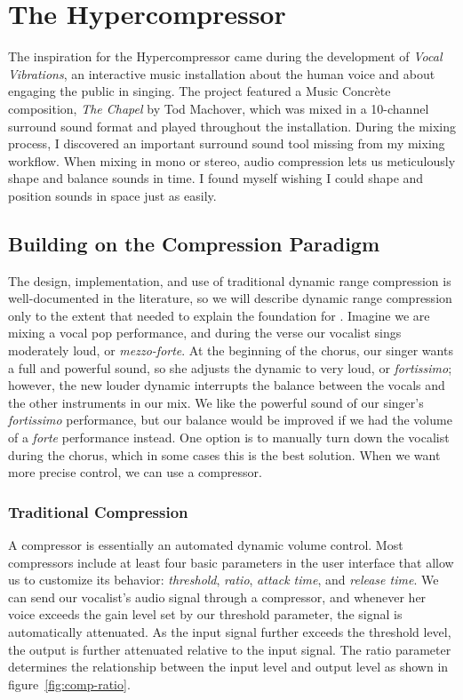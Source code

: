\chapter{The Hypercompressor}
\label{ch:hypercompressor}

The inspiration for the Hypercompressor came during the development of
\textit{Vocal Vibrations}, an interactive music installation about the human
voice and about engaging the public in singing.\cite{Holbrow2014} The
project featured a Music Concr\`{e}te composition, \textit{The Chapel}
by Tod Machover, which was mixed in a 10-channel surround sound
format and played throughout the installation. During the mixing
process, I discovered an important surround sound tool missing from my
mixing workflow. When mixing in mono or stereo, audio
compression lets us meticulously shape and balance sounds in
time. I found myself wishing I could shape and position sounds in
space just as easily.

\section{Building on the Compression Paradigm}
The design, implementation, and use of traditional dynamic range
compression is well-documented in the
literature,\cite[]{Giannoulis2012,Case2007,Deruty2014} so we will
describe dynamic range compression only to the extent that needed to
explain the foundation for \thesis. Imagine we are mixing a vocal pop
performance, and during the verse our vocalist sings moderately
loud, or \textit{mezzo-forte}. At the beginning of the chorus, our
singer wants a full and powerful sound, so she adjusts the dynamic to
very loud, or \textit{fortissimo}; however, the new louder dynamic
interrupts the balance between the vocals and the other instruments in
our mix. We like the powerful sound of our singer's
\textit{fortissimo} performance, but our balance would be improved if
we had the volume of a \textit{forte} performance instead. One option
is to manually turn down the vocalist during the chorus, which in some
cases this is the best solution. When we want more precise control, we
can use a compressor.

\subsection{Traditional Compression}
\label{sec:trad-compr}
A compressor is essentially an automated dynamic volume control.  Most
compressors include at least four basic parameters in the user
interface that allow us to customize its behavior: \textit{threshold},
\textit{ratio}, \textit{attack time}, and \textit{release time}.  We
can send our vocalist's audio signal through a compressor, and
whenever her voice exceeds the gain level set by our threshold
parameter, the signal is automatically attenuated. As the input signal
further exceeds the threshold level, the output is further attenuated
relative to the input signal. The ratio parameter determines the
relationship between the input level and output level as shown in
figure~\ref{fig:comp-ratio}.

